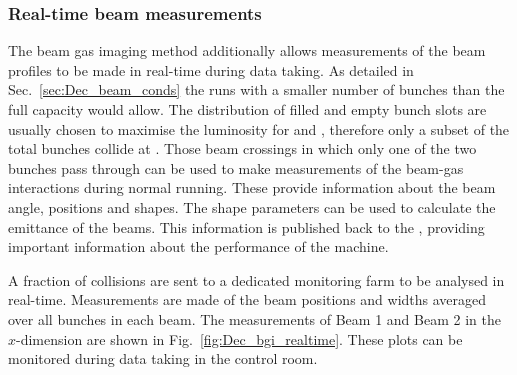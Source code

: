 \subsubsection{Real-time beam measurements}
The beam gas imaging method additionally allows measurements of the beam profiles to be made in real-time during data taking. 
As detailed in Sec.~\ref{sec:Dec_beam_conds} the \lhc runs with a smaller number of bunches than the full capacity would allow. The distribution of filled and empty bunch slots are usually chosen to maximise the luminosity for \atlas and \cms, therefore only a subset of the total bunches collide at \lhcb. Those beam crossings in which only one of the two bunches pass through \lhcb can be used to make measurements of the beam-gas interactions during normal running.
These provide information about the beam angle, positions and shapes. The shape parameters can be used to calculate the emittance of the beams. This information is published back to the \lhc, providing important information about the performance of the machine.

A fraction of collisions are sent to a dedicated monitoring farm to be analysed in real-time. Measurements are made of the beam positions and widths averaged over all bunches in each beam. The measurements of Beam 1 and Beam 2 in the $x$-dimension are shown in Fig.~\ref{fig:Dec_bgi_realtime}. These plots can be monitored during data taking in the \lhcb control room.   

